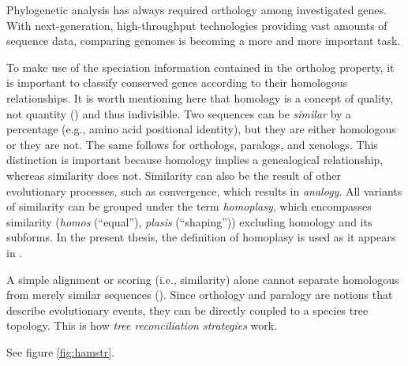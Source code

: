 Phylogenetic analysis has always required orthology among investigated genes.
With next-generation, high-throughput technologies providing vast amounts of
sequence data, comparing genomes is becoming a more and more important task. 

To make use of the speciation information contained in the ortholog property, it
is important to classify conserved genes according to their homologous
relationships. It is worth mentioning here that homology is a concept of
quality, not quantity (\cite{reeck1987}) and thus indivisible. Two sequences can
be \emph{similar} by a percentage (e.g., amino acid positional identity), but
they are either homologous or they are not. The same follows for orthologs,
paralogs, and xenologs. This distinction is important because homology implies a
genealogical relationship, whereas similarity does not. Similarity can also be
the result of other evolutionary processes, such as convergence, which results
in \emph{analogy}. All variants of similarity can be grouped under the term
\emph{homoplasy}, which encompasses similarity (\emph{homos} (``equal''),
\emph{plasis} (``shaping'')) excluding homology and its subforms. In the present
thesis, the definition of homoplasy is used as it appears in \cite{page1998}.

A simple alignment or scoring (i.e., similarity) alone cannot separate
homologous from merely similar sequences (\cite{eisen1998}). Since orthology and
paralogy are notions that describe evolutionary events, they can be directly
coupled to a species tree topology. This is how \emph{tree reconciliation
strategies} work. 

See figure \ref{fig:hamstr}.
